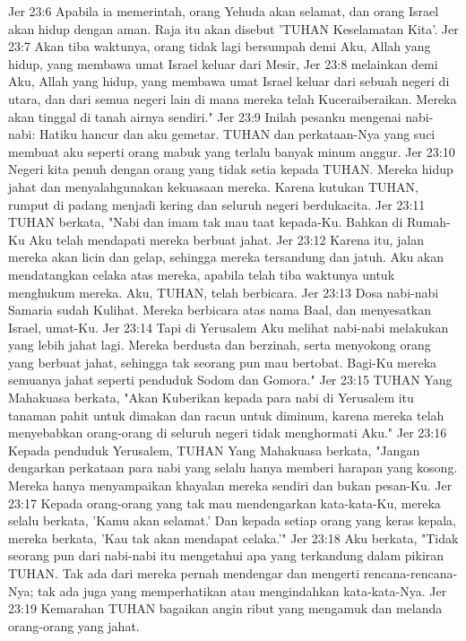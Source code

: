 Jer 23:6  Apabila ia memerintah, orang Yehuda akan selamat, dan orang Israel akan hidup dengan aman. Raja itu akan disebut 'TUHAN Keselamatan Kita'.
Jer 23:7  Akan tiba waktunya, orang tidak lagi bersumpah demi Aku, Allah yang hidup, yang membawa umat Israel keluar dari Mesir,
Jer 23:8  melainkan demi Aku, Allah yang hidup, yang membawa umat Israel keluar dari sebuah negeri di utara, dan dari semua negeri lain di mana mereka telah Kuceraiberaikan. Mereka akan tinggal di tanah airnya sendiri."
Jer 23:9  Inilah pesanku mengenai nabi-nabi: Hatiku hancur dan aku gemetar. TUHAN dan perkataan-Nya yang suci membuat aku seperti orang mabuk yang terlalu banyak minum anggur.
Jer 23:10  Negeri kita penuh dengan orang yang tidak setia kepada TUHAN. Mereka hidup jahat dan menyalahgunakan kekuasaan mereka. Karena kutukan TUHAN, rumput di padang menjadi kering dan seluruh negeri berdukacita.
Jer 23:11  TUHAN berkata, "Nabi dan imam tak mau taat kepada-Ku. Bahkan di Rumah-Ku Aku telah mendapati mereka berbuat jahat.
Jer 23:12  Karena itu, jalan mereka akan licin dan gelap, sehingga mereka tersandung dan jatuh. Aku akan mendatangkan celaka atas mereka, apabila telah tiba waktunya untuk menghukum mereka. Aku, TUHAN, telah berbicara.
Jer 23:13  Dosa nabi-nabi Samaria sudah Kulihat. Mereka berbicara atas nama Baal, dan menyesatkan Israel, umat-Ku.
Jer 23:14  Tapi di Yerusalem Aku melihat nabi-nabi melakukan yang lebih jahat lagi. Mereka berdusta dan berzinah, serta menyokong orang yang berbuat jahat, sehingga tak seorang pun mau bertobat. Bagi-Ku mereka semuanya jahat seperti penduduk Sodom dan Gomora."
Jer 23:15  TUHAN Yang Mahakuasa berkata, "Akan Kuberikan kepada para nabi di Yerusalem itu tanaman pahit untuk dimakan dan racun untuk diminum, karena mereka telah menyebabkan orang-orang di seluruh negeri tidak menghormati Aku."
Jer 23:16  Kepada penduduk Yerusalem, TUHAN Yang Mahakuasa berkata, "Jangan dengarkan perkataan para nabi yang selalu hanya memberi harapan yang kosong. Mereka hanya menyampaikan khayalan mereka sendiri dan bukan pesan-Ku.
Jer 23:17  Kepada orang-orang yang tak mau mendengarkan kata-kata-Ku, mereka selalu berkata, 'Kamu akan selamat.' Dan kepada setiap orang yang keras kepala, mereka berkata, 'Kau tak akan mendapat celaka.'"
Jer 23:18  Aku berkata, "Tidak seorang pun dari nabi-nabi itu mengetahui apa yang terkandung dalam pikiran TUHAN. Tak ada dari mereka pernah mendengar dan mengerti rencana-rencana-Nya; tak ada juga yang memperhatikan atau mengindahkan kata-kata-Nya.
Jer 23:19  Kemarahan TUHAN bagaikan angin ribut yang mengamuk dan melanda orang-orang yang jahat.
